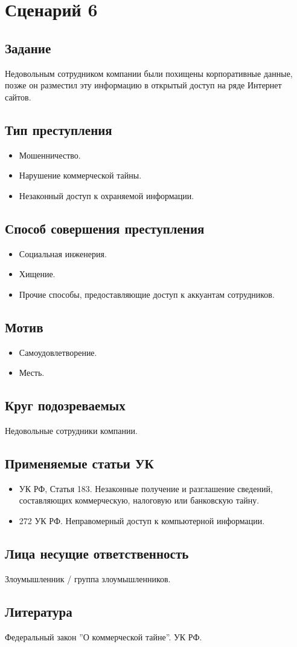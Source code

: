 \section*{Сценарий 6}

\subsection*{Задание}
Недовольным сотрудником компании были похищены корпоративные данные, позже он
разместил эту информацию в открытый доступ на ряде Интернет сайтов.

\subsection*{Тип преступления}
\begin{itemize}
  \item Мошенничество.
  \item Нарушение коммерческой тайны.
  \item Незаконный доступ к охраняемой информации.
\end{itemize}

\subsection*{Способ совершения преступления}
\begin{itemize}
  \item Социальная инженерия.
  \item Хищение.
  \item Прочие способы, предоставляющие доступ к аккуантам сотрудников.
\end{itemize}

\subsection*{Мотив}
\begin{itemize}
  \item Самоудовлетворение.
  \item Месть.
\end{itemize}

\subsection*{Круг подозреваемых}
Недовольные сотрудники компании. 

\subsection*{Применяемые статьи УК}
\begin{itemize}
  \item УК РФ, Статья 183. Незаконные получение и разглашение сведений,
    составляющих коммерческую, налоговую или банковскую тайну.
  \item 272 УК РФ. Неправомерный доступ к компьютерной информации.
\end{itemize}

\subsection*{Лица несущие ответственность}
Злоумышленник / группа злоумышленников.

\subsection*{Литература} Федеральный закон ''О коммерческой тайне''. УК РФ.
